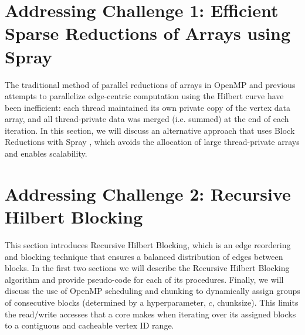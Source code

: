 \section{Addressing Challenge 1: Efficient Sparse Reductions of Arrays using Spray}
The traditional method of parallel reductions of arrays in OpenMP \cite{openmp} and previous attempts to parallelize edge-centric computation using the Hilbert curve \cite{cagra} have been inefficient: each thread maintained its own private copy of the vertex data array, and all thread-private data was merged (i.e. summed) at the end of each iteration. In this section, we will discuss an alternative approach that uses Block Reductions with Spray \cite{spray}, which avoids the allocation of large thread-private arrays and enables scalability.

\section{Addressing Challenge 2: Recursive Hilbert Blocking}

This section introduces Recursive Hilbert Blocking, which is an edge reordering and blocking technique 
that ensures a balanced distribution of edges between blocks. In the first two sections we will describe the Recursive Hilbert Blocking algorithm and provide pseudo-code for each of its procedures. Finally, we will discuss the use of OpenMP scheduling and chunking to dynamically assign groups of consecutive blocks (determined by a hyperparameter, $c$, chunksize). This limits the read/write accesses that a core makes when iterating over its assigned blocks to a contiguous and cacheable vertex ID range.

